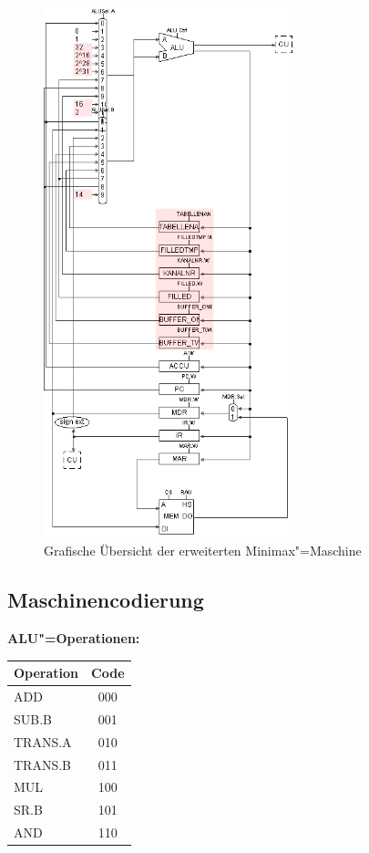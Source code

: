 \begin{figure}[htb]
    \centering
    \includegraphics[width=0.65\textwidth]{dokumentation/res/minimax_maschinenlayout_highlight.png}
    \caption{Grafische Übersicht der erweiterten Minimax"=Maschine}
    \label{figure:Dokumentation-Implementierung-Hardwareerweiterung-Layout}
\end{figure}

\clearpage

\subsection{Maschinencodierung}
\label{subsection:Dokumentation-Implementierung-Hardwareerweiterung-Maschinencodierung}

\textbf{ALU"=Operationen:}

\begin{tabular}{lc}
    Operation & Code \\
    \hline
    ADD       & 000 \\
    SUB.B     & 001 \\
    TRANS.A   & 010 \\
    TRANS.B   & 011 \\
    MUL       & 100 \\
    SR.B      & 101 \\
    AND       & 110 \\
\end{tabular}

